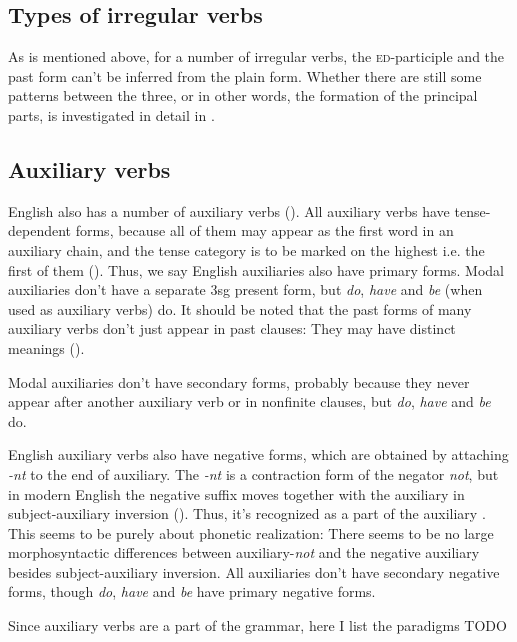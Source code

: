 \documentclass[UTF8, a4paper, oneside, scheme=plain]{ctexrep}
\newcommand*{\citepage}[1]{pp.~{#1}}
\newcommand{\corpus}[1]{\emph{#1}}
\newcommand{\category}[1]{\textsc{#1}}
\begin{document}
\subsection{Types of irregular verbs}

As is mentioned above, for a number of irregular verbs,
the \category{ed}-participle and the past form can't be inferred from the plain form.
Whether there are still some patterns between the three,
or in other words,
the formation of the principal parts,
is investigated in detail in \citet[\citepage{105-120}]{quirk1985}.

\subsection{Auxiliary verbs}\label{sec:verb-inflection.auxiliary}

English also has a number of auxiliary verbs ().
All auxiliary verbs have tense-dependent forms,
because all of them may appear as the first word in an auxiliary chain,
and the tense category is to be marked on the highest i.e. the first of them ().
Thus, we say English auxiliaries also have primary forms.
Modal auxiliaries don't have a separate 3sg present form,
but \corpus{do}, \corpus{have} and \corpus{be} (when used as auxiliary verbs) do.
It should be noted that the past forms of many auxiliary verbs don't just appear in past clauses:
They may have distinct meanings ().

Modal auxiliaries don't have secondary forms,
probably because they never appear after another auxiliary verb 
or in nonfinite clauses,
but \corpus{do}, \corpus{have} and \corpus{be} do.

English auxiliary verbs also have negative forms,
which are obtained by attaching \corpus{-nt} to the end of auxiliary.
The \corpus{-nt} is a contraction form of the negator \corpus{not},
but in modern English the negative suffix moves together with the auxiliary in
subject-auxiliary inversion ().
Thus, it's recognized as a part of the auxiliary \citep[\citepage{91}]{cgel}.
This seems to be purely about phonetic realization:
There seems to be no large morphosyntactic differences 
between auxiliary-\corpus{not} and the negative auxiliary
besides subject-auxiliary inversion.
All auxiliaries don't have secondary negative forms,
though \corpus{do}, \corpus{have} and \corpus{be} have primary negative forms.

Since auxiliary verbs are a part of the grammar,
here I list the paradigms TODO
\end{document}

